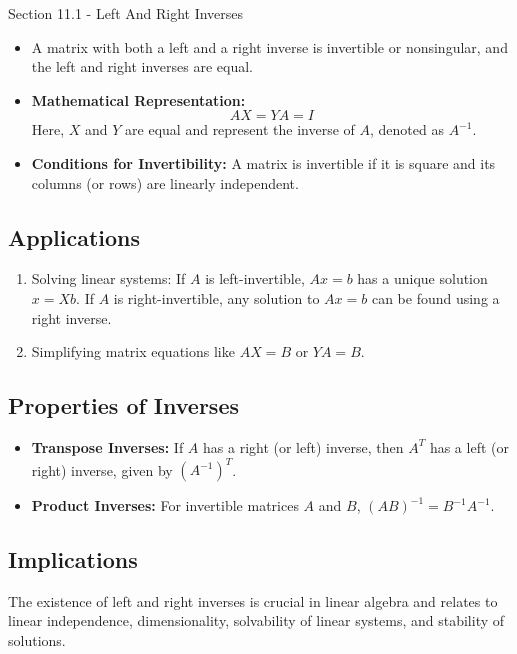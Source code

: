 \begin{notes}{Section 11.1 - Left And Right Inverses}
    \begin{Highlight}[Invertibility]
        \begin{itemize}
            \item A matrix with both a left and a right inverse is invertible or nonsingular, and the left and right inverses are equal.
            \item \textbf{Mathematical Representation:} 
            \begin{equation*}
                AX = YA = I
            \end{equation*}
            Here, $X$ and $Y$ are equal and represent the inverse of $A$, denoted as $A^{-1}$.
            \item \textbf{Conditions for Invertibility:} A matrix is invertible if it is square and its columns (or rows) are linearly independent.
        \end{itemize}
    \end{Highlight}

    \subsection*{Applications}
    \begin{enumerate}
        \item Solving linear systems: If $A$ is left-invertible, $Ax = b$ has a unique solution $x = Xb$. If $A$ is right-invertible, any solution to $Ax = b$ can be found using a right inverse.
        \item Simplifying matrix equations like $AX = B$ or $YA = B$.
    \end{enumerate}

    \subsection*{Properties of Inverses}
    \begin{itemize}
        \item \textbf{Transpose Inverses:} If $A$ has a right (or left) inverse, then $A^T$ has a left (or right) inverse, given by $(A^{-1})^T$.
        \item \textbf{Product Inverses:} For invertible matrices $A$ and $B$, $(AB)^{-1} = B^{-1}A^{-1}$.
    \end{itemize}

    \subsection*{Implications}
    The existence of left and right inverses is crucial in linear algebra and relates to linear independence, dimensionality, solvability of linear systems, and stability of solutions.
\end{notes}

